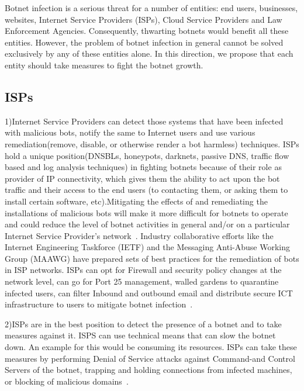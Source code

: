 \label{cap:sec1}


Botnet infection is a serious threat for a number of entities: end users, businesses, websites, Internet Service Providers (ISPs), Cloud Service Providers and Law Enforcement Agencies. Consequently, thwarting botnets would benefit all these entities. However, the problem of botnet infection in general cannot be solved exclusively by any of these entities alone. In this direction, we propose that each entity should take measures to fight the botnet growth.

\subsection{ISPs}

1)Internet Service Providers can detect those systems that have been infected with malicious bots, notify the same to Internet users and use various remediation(remove, disable, or otherwise render a bot harmless) techniques. ISPs hold a unique position(DNSBLs, honeypots, darknets, passive DNS, traffic flow based and log analysis techniques) in fighting botnets because of  their role as provider of IP connectivity, which gives them the ability to act upon the bot traffic and their access to the end users (to contacting them, or asking them to install certain software, etc).Mitigating the effects of and remediating the installations of malicious bots will make it more difficult for botnets to operate and could reduce the level of botnet activities in general and/or on a particular Internet Service Provider's network~\cite{anderson2013measuring}. Industry collaborative efforts like the Internet Engineering Taskforce (IETF) and the Messaging Anti-Abuse Working Group (MAAWG) have prepared sets of best practices for the remediation of bots in ISP networks. ISPs can opt for Firewall and security policy changes at the network level, can go for Port 25 management, walled gardens to quarantine infected users, can filter Inbound and outbound email and distribute secure ICT infrastructure to users to mitigate botnet infection~\cite{charney2012collective}. 
	

2)ISPs are in the best position to detect the presence of a botnet and to take measures against it. ISPS can use technical means that can slow the botnet down. An example for this would be consuming its resources. ISPs can take these measures by performing Denial of Service attacks against Command-and Control Servers of the botnet, trapping and holding connections from infected machines, or blocking of malicious domains~\cite{leder2009proactive}. 

